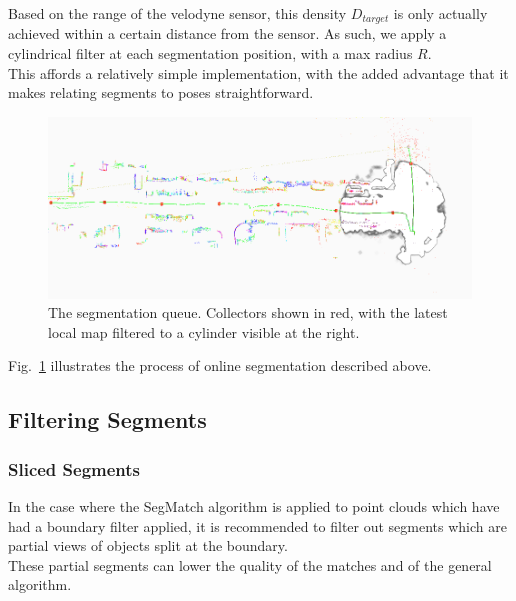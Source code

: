 Based on the range of the velodyne sensor, this density $D_{target}$ is only actually achieved within a certain distance from the sensor. As such, we apply a cylindrical filter at each segmentation position, with a max radius $R$.\\

This affords a relatively simple implementation, with the added advantage that it makes relating segments to poses straightforward.\\



\begin{figure}
  \centering
  \includegraphics[width=5.2in]{images/seg_queue.png}
  \caption{The segmentation queue. Collectors shown in red, with the latest local map filtered to a cylinder visible at the right.}
  \label{fig:seg-queue}
\end{figure}

Fig.~\ref{fig:seg-queue} illustrates the process of online segmentation described above.
\subsection{Filtering Segments}

\label{subsec:filtering-segments}

\subsubsection{Sliced Segments}
\label{subsub:sec:sliced}

In the case where the SegMatch algorithm is applied to point clouds which have had a boundary filter applied, it is recommended to filter out segments which are partial views of objects split at the boundary.\\

These partial segments can lower the quality of the matches and of the general algorithm.\\

